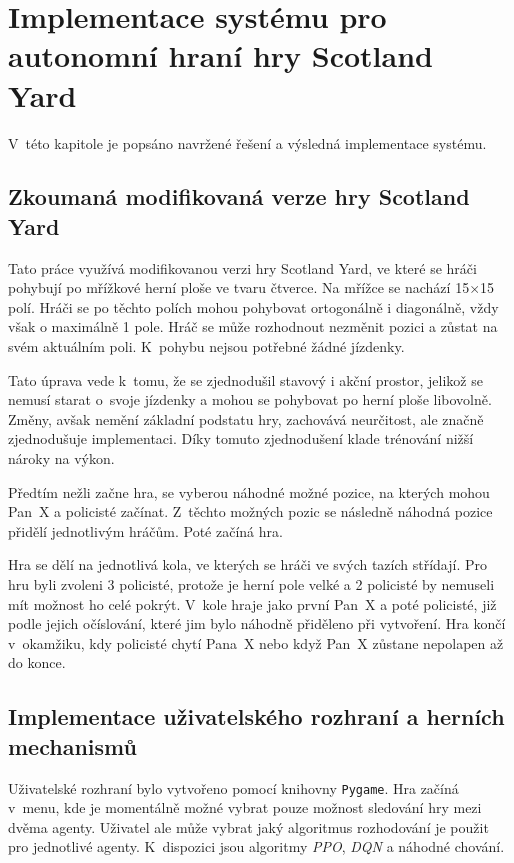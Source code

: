 \chapter{Implementace systému pro autonomní hraní hry Scotland Yard}
\label{ch:navrh}
V~této kapitole je popsáno navržené řešení a výsledná implementace systému.
\section{Zkoumaná modifikovaná verze hry Scotland Yard}\label{sec:zkoumana-modifikovana-verze-hry-scotland-yard}

Tato práce využívá modifikovanou verzi hry Scotland Yard, ve které se hráči pohybují po mřížkové herní ploše ve tvaru čtverce.
Na mřížce se nachází 15$\times$15 polí.
Hráči se po těchto polích mohou pohybovat ortogonálně i diagonálně, vždy však o maximálně 1 pole.
Hráč se může rozhodnout nezměnit pozici a zůstat na svém aktuálním poli.
K~pohybu nejsou potřebné žádné jízdenky.

Tato úprava vede k~tomu, že se zjednodušil stavový i akční prostor, jelikož se nemusí starat o~svoje jízdenky a mohou se pohybovat po herní ploše libovolně.
Změny, avšak nemění základní podstatu hry, zachovává neurčitost, ale značně zjednodušuje implementaci.
Díky tomuto zjednodušení klade trénování nižší nároky na výkon.

Předtím nežli začne hra, se vyberou náhodné možné pozice, na kterých mohou Pan~X a policisté začínat.
Z~těchto možných pozic se následně náhodná pozice přidělí jednotlivým hráčům.
Poté začíná hra.

Hra se dělí na jednotlivá kola, ve kterých se hráči ve svých tazích střídají.
Pro hru byli zvoleni 3 policisté, protože je herní pole velké a 2 policisté by nemuseli mít možnost ho celé pokrýt.
V~kole hraje jako první Pan~X a poté policisté, již podle jejich očíslování, které jim bylo náhodně přiděleno při vytvoření.
Hra končí v~okamžiku, kdy policisté chytí Pana~X nebo když Pan~X zůstane nepolapen až do konce.

\section{Implementace uživatelského rozhraní a herních mechanismů}\label{subsec:implementace-uzivatelskeho-rozrani-a-hernich-mechanismu}

Uživatelské rozhraní bylo vytvořeno pomocí knihovny \texttt{Pygame}.
Hra začíná v~menu, kde je momentálně možné vybrat pouze možnost sledování hry mezi dvěma agenty.
Uživatel ale může vybrat jaký algoritmus rozhodování je použit pro jednotlivé agenty.
K~dispozici jsou algoritmy \emph{PPO}, \emph{DQN} a náhodné chování.

